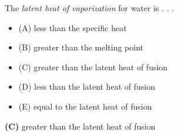 

The {\it latent heat of vaporization} for water is . . .

\begin{itemize}
\item{(A)} less than the specific heat
\vskip 5pt 
\item{(B)} greater than the melting point
\vskip 5pt 
\item{(C)} greater than the latent heat of fusion
\vskip 5pt 
\item{(D)} less than the latent heat of fusion
\vskip 5pt 
\item{(E)} equal to the latent heat of fusion
\end{itemize}







{\bf (C)} greater than the latent heat of fusion
 










